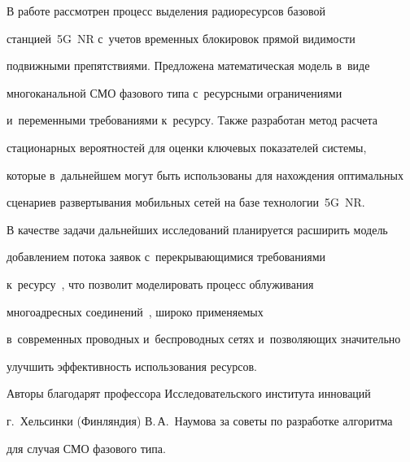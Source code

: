   


  В работе рассмотрен процесс выделения радиоресурсов базовой 


станцией~5G~NR с~учетов временных блокировок прямой видимости 


подвижными препятствиями. Предложена математическая модель в~виде 


многоканальной СМО фазового типа с~ресурсными ограничениями 


и~переменными требованиями к~ресурсу. Также разработан метод расчета 


стационарных вероятностей для оценки ключевых показателей системы, 


которые в~дальнейшем могут быть использованы для нахождения оптимальных 


сценариев развертывания мобильных сетей на базе технологии~5G~NR.


  


  В качестве задачи дальнейших исследований планируется расширить модель 


добавлением потока заявок с~перекрывающимися требованиями 


к~ресурсу~\cite{12-bs}, что позволит моделировать процесс облуживания 


многоадресных соединений~\cite{10-bs, 12-bs, 13-bs}, широко применяемых 


в~современных проводных и~беспроводных сетях и~позволяющих значительно 


улучшить эффективность использования ресурсов.


  


  \smallskip


  


  Авторы благодарят профессора Исследовательского института инноваций 


г.~Хельсинки (Финляндия) В.\,А.~Наумова за советы по разработке алгоритма 


для случая СМО фазового типа.








